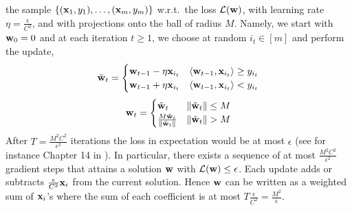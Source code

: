 the sample $\{({\mathbf x}_1,y_1),\ldots,({\mathbf x}_m,y_m)\}$ w.r.t.\ the loss ${\cal L}({\mathbf w})$, with
learning rate $\eta = \frac{\epsilon}{C^2}$, and with projections onto the
ball of radius $M$. Namely, we start with ${\mathbf w}_0=0$ and at each iteration
$t\ge 1$, we choose at random $i_t\in [m]$ and perform the update,
\[
\tilde{{\mathbf w}}_t = \begin{cases}
{\mathbf w}_{t-1}-\eta{\mathbf x}_{i_t} & \langle {\mathbf w}_{t-1},{\mathbf x}_{i_t} \rangle \ge y_{i_t}
\\
{\mathbf w}_{t-1}+\eta{\mathbf x}_{i_t} & \langle {\mathbf w}_{t-1},{\mathbf x}_{i_t} \rangle < y_{i_t}
\end{cases}
\]
\[
{\mathbf w}_t = \begin{cases}
\tilde{{\mathbf w}}_{t} & \|\tilde{{\mathbf w}}_{t}\|\le M
\\
\frac{M \tilde{{\mathbf w}}_{t}}{\|\tilde{{\mathbf w}}_{t}\|} & \|\tilde{{\mathbf w}}_{t}\| > M
\end{cases}
\]
After $T=\frac{M^2C^2}{\epsilon^2}$ iterations the loss in expectation would
be at most $\epsilon$ (see for instance Chapter 14 in
\cite{shalev2014understanding}). In particular, there exists a sequence of
at most $\frac{M^2C^2}{\epsilon^2}$ gradient steps that attains a solution
${\mathbf w}$ with ${\cal L}({\mathbf w})\le \epsilon$.  Each update adds or subtracts
$\frac{\epsilon}{C^2}{\mathbf x}_i$ from the current solution. Hence ${\mathbf w}$ can be
written as a weighted sum of ${\mathbf x}_i$'s where the sum of each coefficient
is at most $T\frac{\epsilon}{C^2}=\frac{M^2}{\epsilon}$.
\proofbox

